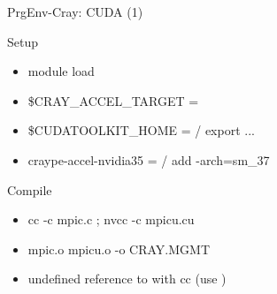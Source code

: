
\begin{frame}[fragile]{PrgEnv-Cray: CUDA (1)}

\begin{info}{Setup}
\begin{itemize}
 \item module load       
 \item \$CRAY\_ACCEL\_TARGET = 
 \item \$CUDATOOLKIT\_HOME =  / export ... 
 \item craype-accel-nvidia35 =  / add -arch=sm\_37 
\end{itemize}
\end{info}

\begin{info}{Compile}
\begin{itemize}
 \item cc -c mpic.c ; nvcc  -c mpicu.cu
 \item {} mpic.o mpicu.o -o CRAY.MGMT 
 \item undefined reference to  with cc (use )
\end{itemize}
\end{info}

\end{frame}



